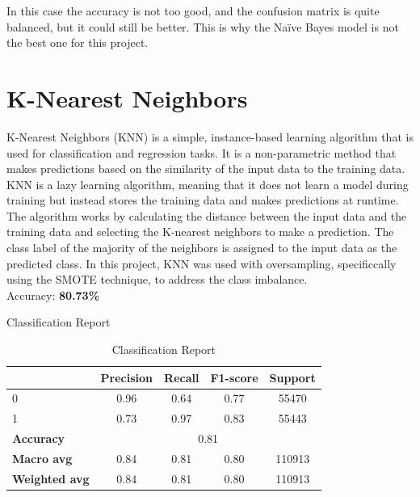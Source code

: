 In this case the accuracy is not too good, and the confusion matrix is quite balanced, but it could still be better. This is why the Naïve Bayes model is not the best one for this project.
\newpage


\section{K-Nearest Neighbors}

K-Nearest Neighbors (KNN) is a simple, instance-based learning algorithm that is used for classification and regression tasks. It is a non-parametric method that makes predictions based on the similarity of the input data to the training data. KNN is a lazy learning algorithm, meaning that it does not learn a model during training but instead stores the training data and makes predictions at runtime. The algorithm works by calculating the distance between the input data and the training data and selecting the K-nearest neighbors to make a prediction. The class label of the majority of the neighbors is assigned to the input data as the predicted class. In this project, KNN was used with oversampling, specificcally using the SMOTE technique, to address the class imbalance.\\

Accuracy: \textbf{80.73\%}


Classification Report
\begin{table}[h]
    \centering
    \begin{tabular}{lcccc}
        \toprule
        & \textbf{Precision} & \textbf{Recall} & \textbf{F1-score} & \textbf{Support} \\
        \midrule
        0 & 0.96 & 0.64 & 0.77 & 55470 \\
        1 & 0.73 & 0.97 & 0.83 & 55443 \\
        \midrule
        \textbf{Accuracy} & \multicolumn{4}{c}{0.81} \\
        \textbf{Macro avg} & 0.84 & 0.81 & 0.80 & 110913 \\
        \textbf{Weighted avg} & 0.84 & 0.81 & 0.80 & 110913 \\
        \bottomrule
    \end{tabular}
    \caption{Classification Report}
    \label{tab:classification_report}
\end{table}

